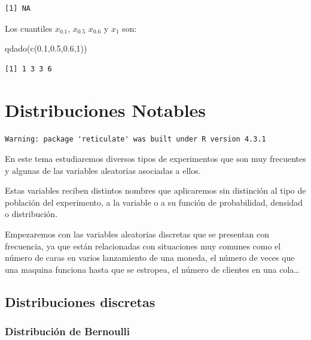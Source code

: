 \documentclass[
  letterpaper,
  DIV=11,
  numbers=noendperiod]{scrreprt}
\newenvironment{Shaded}{\begin{snugshade}}{\end{snugshade}}
\newcommand{\DecValTok}[1]{\textcolor[rgb]{0.68,0.00,0.00}{#1}}
\newcommand{\FloatTok}[1]{\textcolor[rgb]{0.68,0.00,0.00}{#1}}
\newcommand{\FunctionTok}[1]{\textcolor[rgb]{0.28,0.35,0.67}{#1}}
\newcommand{\NormalTok}[1]{\textcolor[rgb]{0.00,0.23,0.31}{#1}}
\begin{document}
\begin{verbatim}
[1] NA
\end{verbatim}

Los cuantiles \(x_{0.1}\), \(x_{0.5}\) \(x_{0.6}\) y \(x_1\) son:

\begin{Shaded}
\begin{Highlighting}[]
\FunctionTok{qdado}\NormalTok{(}\FunctionTok{c}\NormalTok{(}\FloatTok{0.1}\NormalTok{,}\FloatTok{0.5}\NormalTok{,}\FloatTok{0.6}\NormalTok{,}\DecValTok{1}\NormalTok{))}
\end{Highlighting}
\end{Shaded}

\begin{verbatim}
[1] 1 3 3 6
\end{verbatim}


\hypertarget{distribuciones-notables}{%
\chapter{Distribuciones Notables}\label{distribuciones-notables}}

\begin{verbatim}
Warning: package 'reticulate' was built under R version 4.3.1
\end{verbatim}

En este tema estudiaremos diversos tipos de experimentos que son muy
frecuentes y algunas de las variables aleatorias asociadas a ellos.

Estas variables reciben distintos nombres que aplicaremos sin distinción
al tipo de población del experimento, a la variable o a su función de
probabilidad, densidad o distribución.

Empezaremos con las variables aleatorias discretas que se presentan con
frecuencia, ya que están relacionadas con situaciones muy comunes como
el número de caras en varios lanzamiento de una moneda, el número de
veces que una maquina funciona hasta que se estropea, el número de
clientes en una cola\ldots{}

\hypertarget{distribuciones-discretas}{%
\section{Distribuciones discretas}\label{distribuciones-discretas}}

\hypertarget{distribuciuxf3n-de-bernoulli}{%
\subsection{Distribución de
Bernoulli}\label{distribuciuxf3n-de-bernoulli}}
\end{document}
